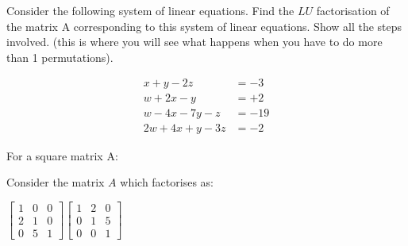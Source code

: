 \documentclass[solution,addpoints,12pt]{exam}
\begin{document}
\begin{questions}
\begin{parts}
\end{parts}

\question[2] Consider the following system of linear equations. Find the $LU$ factorisation of the matrix A corresponding to this system of linear equations. Show all the steps involved. (this is where you will see what happens when you have to do more than 1 permutations).

\begin{align*}
x + y - 2z  &=  -3\\
w + 2x - y         &= +2\\
w - 4x - 7y  -z   &= -19\\
2w + 4x + y -3z  &=  -2 
\end{align*}

\begin{solution}

\end{solution}

\question[1 \half] For a square matrix A:


\question[1 \half] Consider the matrix $A$ which factorises as:

$\begin{bmatrix}
1 & 0 & 0\\
2 & 1 & 0\\
0 & 5 & 1
\end{bmatrix}
\begin{bmatrix}
1 & 2 & 0\\
0 & 1 & 5\\
0 & 0 & 1
\end{bmatrix}$



\end{questions}
\end{document}
